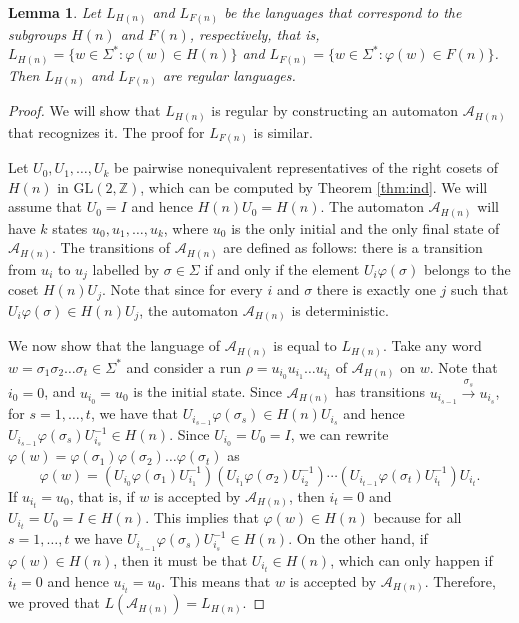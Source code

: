 \documentclass[fontsize=11pt,DIV=13,paper=letter]{scrartcl}
\newtheorem{lemma}[theorem]{Lemma}
\theoremstyle{definition}
\newcommand{\A}{\mathcal{A}}
\newcommand{\Z}{\mathbb{Z}}
\newcommand{\GL}{\mathrm{GL}(2,\Z)}
\renewcommand{\phi}{\varphi}
\begin{document}
\begin{lemma}
\label{lem:regsub}
Let $L_{H(n)}$ and $L_{F(n)}$ be the languages that correspond to the subgroups $H(n)$ and $F(n)$, respectively, that is, $L_{H(n)} = \{w\in \Sigma^* : \phi(w)\in H(n)\}$ and $L_{F(n)} = \{w\in \Sigma^* : \phi(w)\in F(n)\}$. Then $L_{H(n)}$ and $L_{F(n)}$ are regular languages.
\end{lemma}

\begin{proof}
We will show that $L_{H(n)}$ is regular by constructing an automaton $\A_{H(n)}$ that recognizes it. The proof for $L_{F(n)}$ is similar.

Let $U_0,U_1,\dots,U_k$ be pairwise nonequivalent representatives of the right cosets of $H(n)$ in $\GL$, which can be computed by Theorem \ref{thm:ind}. We will assume that $U_0=I$ and hence $H(n)U_0=H(n)$. The automaton $\A_{H(n)}$ will have $k$ states $u_0,u_1,\dots,u_k$, where $u_0$ is the only initial and the only final state of $\A_{H(n)}$. The transitions of $\A_{H(n)}$ are defined as follows: there is a transition from $u_i$ to $u_j$ labelled by $\sigma\in \Sigma$ if and only if the element $U_i\phi(\sigma)$ belongs to the coset $H(n)U_j$. Note that since for every $i$ and $\sigma$ there is exactly one $j$ such that $U_i\phi(\sigma)\in H(n)U_j$, the automaton $\A_{H(n)}$ is deterministic.

We now show that the language of $\A_{H(n)}$ is equal to $L_{H(n)}$. Take any word $w=\sigma_1\sigma_2\dots\sigma_t \in \Sigma^*$ and consider a run $\rho = u_{i_0}u_{i_1}\dots u_{i_t}$ of $\A_{H(n)}$ on $w$. Note that $i_0=0$, and $u_{i_0}=u_0$ is the initial state. Since $\A_{H(n)}$ has transitions $u_{i_{s-1}} \xrightarrow{\sigma_s} u_{i_s}$, for $s=1,\dots,t$, we have that $U_{i_{s-1}}\phi(\sigma_s)\in H(n)U_{i_s}$ and hence $U^{}_{i_{s-1}}\phi(\sigma_s)U_{i_s}^{-1}\in H(n)$. Since $U_{i_0}=U_0=I$, we can rewrite $\phi(w)=\phi(\sigma_1)\phi(\sigma_2)\dots\phi(\sigma_t)$ as
\[
\phi(w)=(U^{}_{i_0}\phi(\sigma_1)U_{i_1}^{-1})(U^{}_{i_1}\phi(\sigma_2)U_{i_2}^{-1})\cdots (U^{}_{i_{t-1}}\phi(\sigma_t)U_{i_t}^{-1})U^{}_{i_t}.
\]
If $u_{i_t}=u_0$, that is, if $w$ is accepted by $\A_{H(n)}$, then $i_t=0$ and $U_{i_t} = U_0=I\in H(n)$. This implies that $\phi(w)\in H(n)$ because for all $s=1,\dots,t$ we have $U^{}_{i_{s-1}}\phi(\sigma_s)U_{i_s}^{-1}\in H(n)$. On the other hand, if $\phi(w)\in H(n)$, then it must be that $U_{i_t}\in H(n)$, which can only happen if $i_t=0$ and hence $u_{i_t}=u_0$. This means that $w$ is accepted by $\A_{H(n)}$. Therefore, we proved that $L(\A_{H(n)}) = L_{H(n)}$.

\end{proof}
\end{document}
